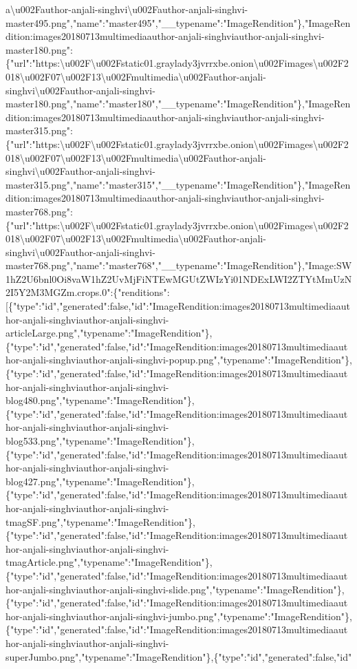 a\textbackslash{}u002Fauthor-anjali-singhvi\textbackslash{}u002Fauthor-anjali-singhvi-master495.png","name":"master495","\_\_typename":"ImageRendition"\},"ImageRendition:images20180713multimediaauthor-anjali-singhviauthor-anjali-singhvi-master180.png":\{"url":"https:\textbackslash{}u002F\textbackslash{}u002Fstatic01.graylady3jvrrxbe.onion\textbackslash{}u002Fimages\textbackslash{}u002F2018\textbackslash{}u002F07\textbackslash{}u002F13\textbackslash{}u002Fmultimedia\textbackslash{}u002Fauthor-anjali-singhvi\textbackslash{}u002Fauthor-anjali-singhvi-master180.png","name":"master180","\_\_typename":"ImageRendition"\},"ImageRendition:images20180713multimediaauthor-anjali-singhviauthor-anjali-singhvi-master315.png":\{"url":"https:\textbackslash{}u002F\textbackslash{}u002Fstatic01.graylady3jvrrxbe.onion\textbackslash{}u002Fimages\textbackslash{}u002F2018\textbackslash{}u002F07\textbackslash{}u002F13\textbackslash{}u002Fmultimedia\textbackslash{}u002Fauthor-anjali-singhvi\textbackslash{}u002Fauthor-anjali-singhvi-master315.png","name":"master315","\_\_typename":"ImageRendition"\},"ImageRendition:images20180713multimediaauthor-anjali-singhviauthor-anjali-singhvi-master768.png":\{"url":"https:\textbackslash{}u002F\textbackslash{}u002Fstatic01.graylady3jvrrxbe.onion\textbackslash{}u002Fimages\textbackslash{}u002F2018\textbackslash{}u002F07\textbackslash{}u002F13\textbackslash{}u002Fmultimedia\textbackslash{}u002Fauthor-anjali-singhvi\textbackslash{}u002Fauthor-anjali-singhvi-master768.png","name":"master768","\_\_typename":"ImageRendition"\},"Image:SW1hZ2U6bnl0Oi8vaW1hZ2UvMjFiNTEwMGUtZWIzYi01NDExLWI2ZTYtMmUzN2I5Y2M3MGZm.crops.0":\{"renditions":{[}\{"type":"id","generated":false,"id":"ImageRendition:images20180713multimediaauthor-anjali-singhviauthor-anjali-singhvi-articleLarge.png","typename":"ImageRendition"\},\{"type":"id","generated":false,"id":"ImageRendition:images20180713multimediaauthor-anjali-singhviauthor-anjali-singhvi-popup.png","typename":"ImageRendition"\},\{"type":"id","generated":false,"id":"ImageRendition:images20180713multimediaauthor-anjali-singhviauthor-anjali-singhvi-blog480.png","typename":"ImageRendition"\},\{"type":"id","generated":false,"id":"ImageRendition:images20180713multimediaauthor-anjali-singhviauthor-anjali-singhvi-blog533.png","typename":"ImageRendition"\},\{"type":"id","generated":false,"id":"ImageRendition:images20180713multimediaauthor-anjali-singhviauthor-anjali-singhvi-blog427.png","typename":"ImageRendition"\},\{"type":"id","generated":false,"id":"ImageRendition:images20180713multimediaauthor-anjali-singhviauthor-anjali-singhvi-tmagSF.png","typename":"ImageRendition"\},\{"type":"id","generated":false,"id":"ImageRendition:images20180713multimediaauthor-anjali-singhviauthor-anjali-singhvi-tmagArticle.png","typename":"ImageRendition"\},\{"type":"id","generated":false,"id":"ImageRendition:images20180713multimediaauthor-anjali-singhviauthor-anjali-singhvi-slide.png","typename":"ImageRendition"\},\{"type":"id","generated":false,"id":"ImageRendition:images20180713multimediaauthor-anjali-singhviauthor-anjali-singhvi-jumbo.png","typename":"ImageRendition"\},\{"type":"id","generated":false,"id":"ImageRendition:images20180713multimediaauthor-anjali-singhviauthor-anjali-singhvi-superJumbo.png","typename":"ImageRendition"\},\{"type":"id","generated":false,"id"